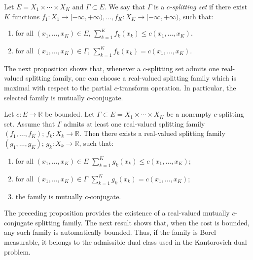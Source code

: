 \documentclass[twoside,11pt,a4paper]{article}
\begin{document}
\begin{definition}
Let \(E = X_1 \times \cdots \times X_K\) and  
\(\Gamma \subset E\).
We say that \(\Gamma\) is a \emph{\(c\)-splitting set} if there exist 
\(K\) functions $f_1 : X_1 \to [-\infty,+\infty), 
 \dots,
f_K : X_K \to [-\infty,+\infty)$, such that:
\begin{enumerate}[nosep, leftmargin=*]
\item for all \((x_1,\dots,x_K)\in E\), $\sum_{k=1}^K f_k(x_k) \le c(x_1,\dots,x_K)$.
\item for all \((x_1,\dots,x_K)\in \Gamma\), $\sum_{k=1}^K f_k(x_k) = c(x_1,\dots,x_K)$.
\end{enumerate}
\end{definition}
\medskip

The next proposition shows that, whenever a \(c\)-splitting set admits one real-valued splitting family, one can choose a real-valued splitting family which is maximal with respect to the partial \(c\)-transform operation. In particular, the selected family is mutually \(c\)-conjugate.



\begin{proposition}
\label{sp}
Let \(c:E\to\mathbb R\) be bounded. Let $
\Gamma\subset E=X_1\times\cdots\times X_K$
be a nonempty \(c\)-splitting set. Assume that \(\Gamma\) admits at least one
real-valued splitting family $
(f_1,\ldots,f_K)  \text{; } f_k:X_k\to\mathbb R$.
Then there exists a real-valued splitting family $
(g_1,\ldots,g_K)  \text{; }g_k:X_k\to\mathbb R$,
such that:
\begin{enumerate}
\item for all \((x_1,\ldots,x_K)\in E\) $
\sum_{k=1}^K g_k(x_k)\le c(x_1,\ldots,x_K)$;

\item for all \((x_1,\ldots,x_K)\in\Gamma\) $
\sum_{k=1}^K g_k(x_k)=c(x_1,\ldots,x_K)$;

\item the family is mutually \(c\)-conjugate.
\end{enumerate}
\end{proposition}




The preceding proposition provides the existence of a real-valued mutually
$c$-conjugate splitting family. The next result shows that, when the cost is
bounded, any such family is automatically bounded. Thus, if the family is
Borel measurable, it belongs to the admissible dual class used in the
Kantorovich dual problem.
\end{document}
